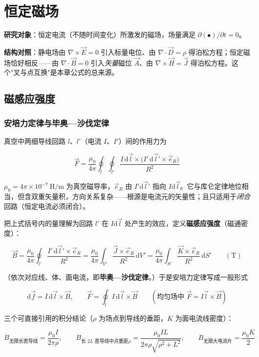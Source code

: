 ﻿%

\chapter{恒定磁场}

\textbf{研究对象}：恒定电流（不随时间变化）所激发的磁场，场量满足 $\partial(\bullet)/\partial t=0$。

\textbf{结构对照}：静电场由 $\nabla\times\vec{E}=0$ 引入标量电位、由 $\nabla\cdot\vec{D}=\rho$ 得泊松方程；恒定磁场恰好相反——由 $\nabla\cdot\vec{B}=0$ 引入\emph{矢量}磁位 $\vec{A}$、由 $\nabla\times\vec{H}=\vec{J}$ 得泊松方程。这个"叉与点互换"是本章公式的总来源。

\section{磁感应强度}

\subsection{安培力定律与毕奥—沙伐定律}
真空中两细导线回路 $l$、$l'$（电流 $I$、$I'$）间的作用力为
\begin{formulaBox}
\[
\vec{F}=\frac{\mu_0}{4\pi}\oint_l\oint_{l'}\frac{I\,\mathrm{d}\vec{l}\times\big(I'\,\mathrm{d}\vec{l}'\times\vec{e}_R\big)}{R^2}
\]
\end{formulaBox}
$\mu_0=4\pi\times10^{-7}\ \mathrm{H/m}$ 为真空磁导率，$\vec{e}_R$ 由 $I'\mathrm{d}\vec{l}'$ 指向 $I\mathrm{d}\vec{l}$。它与库仑定律地位相当，但含双重矢量积，方向关系复杂——根源是电流元的矢量性；且只适用于\emph{闭合}回路（恒定电流必须闭合）。

把上式括号内的量理解为回路 $l'$ 在 $I\mathrm{d}\vec{l}$ 处产生的效应，定义\textbf{磁感应强度}（磁通密度）：
\begin{formulaBox}
\[
\vec{B}=\frac{\mu_0}{4\pi}\oint_{l'}\frac{I'\,\mathrm{d}\vec{l}'\times\vec{e}_R}{R^2}
=\frac{\mu_0}{4\pi}\int_{V'}\frac{\vec{J}\times\vec{e}_R}{R^2}\,\mathrm{d}V'
=\frac{\mu_0}{4\pi}\int_{S'}\frac{\vec{K}\times\vec{e}_R}{R^2}\,\mathrm{d}S'
\qquad(\mathrm{T})
\]
\end{formulaBox}
（依次对应线、体、面电流，即\textbf{毕奥—沙伐定律}。）于是安培力定律写成一般形式
\begin{formulaBox}
\[
\mathrm{d}\vec{f}=I\,\mathrm{d}\vec{l}\times\vec{B},
\qquad
\vec{F}=\oint_l I\,\mathrm{d}\vec{l}\times\vec{B}
\qquad(\text{均匀场中 }\vec{F}=I\vec{l}\times\vec{B})
\]
\end{formulaBox}
三个可直接引用的积分结论（$\rho$ 为场点到导线的垂距，$K$ 为面电流线密度）：
\begin{formulaBox}
\[
B_{\text{无限长直导线}}=\frac{\mu_0 I}{2\pi\rho},
\qquad
B_{\text{长 }2L\text{ 直导线中点垂距}\rho}=\frac{\mu_0 I L}{2\pi\rho\sqrt{\rho^2+L^2}},
\qquad
B_{\text{无限大电流片}}=\frac{\mu_0 K}{2}
\]
\end{formulaBox}

